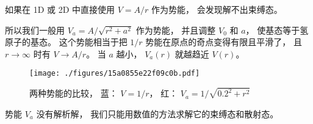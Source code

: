 

如果在 1D 或 2D 中直接使用 $V = A/r$ 作为势能， 会发现解不出束缚态。

所以我们一般用 $V_a = A/\sqrt{r^2 + a^2}$ 作为势能， 并且调整 $V_0$ 和 $a$， 使基态等于氢原子的基态。 这个势能相当于把 $1/r$ 势能在原点的奇点变得有限且平滑了， 且 $r\to\infty$ 时有 $V \to A/r$。 当 $a$ 越小， $V_a(r)$ 就越趋近 $V(r)$。

\begin{figure}[ht]
\centering
\texttt{[image: ./figures/15a0855e22f09c0b.pdf]}
\caption{两种势能的比较， 蓝： $V = 1/r$， 红： $V_a = 1/\sqrt{0.2^2 + r^2}$} \label{fig_Hy1D2D_1}
\end{figure}

势能 $V_a$ 没有解析解， 我们只能用数值的方法求解它的束缚态和散射态。

